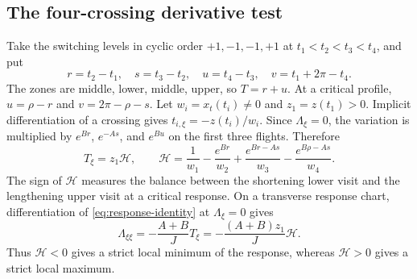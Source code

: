\documentclass[11pt,a4paper]{article}
\begin{document}
\subsection{The four-crossing derivative test}
Take the switching levels in cyclic order $+1,-1,-1,+1$ at
$t_1<t_2<t_3<t_4$, and put
\begin{equation}\label{eq:construction-durations}
 r=t_2-t_1,\quad s=t_3-t_2,\quad
 u=t_4-t_3,\quad v=t_1+2\pi-t_4.
\end{equation}
The zones are middle, lower, middle, upper, so $T=r+u$.
At a critical profile, $u=\rho-r$ and $v=2\pi-\rho-s$.
Let $w_i=x_t(t_i)\ne0$ and $z_1=z(t_1)>0$.
Implicit differentiation of a crossing gives
$t_{i,\xi}=-z(t_i)/w_i$. Since $\Lambda_\xi=0$, the variation
is multiplied by $e^{Br}$, $e^{-As}$, and $e^{Bu}$ on the first
three flights. Therefore
\begin{equation}\label{eq:H-test}
 \boxed{T_\xi=z_1\mathcal H,\qquad
 \mathcal H=\frac1{w_1}-\frac{e^{Br}}{w_2}
       +\frac{e^{Br-As}}{w_3}
       -\frac{e^{B\rho-As}}{w_4}.}
\end{equation}
The sign of $\mathcal H$ measures the balance between the shortening
lower visit and the lengthening upper visit at a critical response.
On a transverse response chart, differentiation of
\eqref{eq:response-identity} at $\Lambda_\xi=0$ gives
\begin{equation}\label{eq:response-curvature}
 \Lambda_{\xi\xi}=-\frac{A+B}{J}T_\xi
 =-\frac{(A+B)z_1}{J}\mathcal H.
\end{equation}
Thus $\mathcal H<0$ gives a strict local minimum of the response,
whereas $\mathcal H>0$ gives a strict local maximum.
\end{document}
